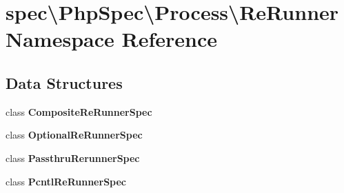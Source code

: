 \section{spec\textbackslash{}Php\+Spec\textbackslash{}Process\textbackslash{}Re\+Runner Namespace Reference}
\label{namespacespec_1_1_php_spec_1_1_process_1_1_re_runner}
\subsection*{Data Structures}
\begin{DoxyCompactItemize}
\item 
class {\bf Composite\+Re\+Runner\+Spec}
\item 
class {\bf Optional\+Re\+Runner\+Spec}
\item 
class {\bf Passthru\+Rerunner\+Spec}
\item 
class {\bf Pcntl\+Re\+Runner\+Spec}
\end{DoxyCompactItemize}
